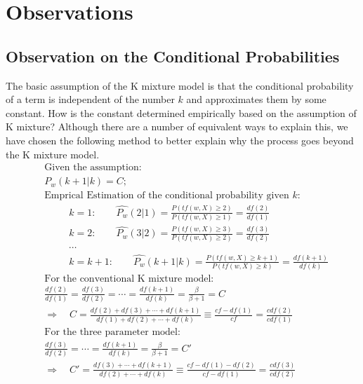 \documentclass[english]{jnlp_1.4_rep}
\begin{document}
\section{Observations}

\subsection{Observation on the Conditional Probabilities}

The basic assumption of the K mixture model is that the conditional probability of a term is independent of the number $k$ and approximates them by
some constant. How is the constant determined empirically based on the assumption of K mixture? Although there are a number of equivalent ways to
explain this, we have chosen the following method to better explain why the process goes beyond the K mixture model.
\begin{align*}
 & \mbox{Given the assumption: } \\
 & P_{w}(k + 1\vert k) = C; \\
 & \mbox{Emprical Estimation of the conditional probability given $k$: }\\
 & \hspace{30pt} k = 1:\qquad \hat{P_{w}}(2 \vert 1)   = \frac{P(\mathit{tf}(w,X)\ge 2)}{P(\mathit{tf}(w,X)\ge 1)}= \frac{\mathit{df}(2) }{\mathit{df}(1) } \\
 & \hspace{30pt}k = 2:\qquad \hat{P_{w}}(3 \vert 2)   = \frac{P(\mathit{tf}(w,X)\ge 3)}{P(\mathit{tf}(w,X)\ge 2)}= \frac{\mathit{df}(3) }{\mathit{df}(2) } \\
 & \hspace{30pt}\cdots \\
 & \hspace{30pt}k= k+1:\qquad\hat{P_{w}}(k+1 \vert k) = \frac{P(\mathit{tf}(w,X)\ge k+1)}{P(\mathit{tf}(w,X)\ge k)} = \frac{\mathit{df}(k+1)}{\mathit{df}(k)}\\
 & \mbox{For the conventional K mixture model: }\\
 & \frac{\mathit{df}(2) }{\mathit{df}(1) } = \frac{\mathit{df}(3) }{\mathit{df}(2) }
	    = \cdots
	    = \frac{\mathit{df}(k+1) }{\mathit{df}(k) } = \frac{\beta }{\beta+ 1} = C  \\
 & \Rightarrow \quad 
    C = \frac{\mathit{df}(2) + \mathit{df}(3) + \cdots + \mathit{df}(k+1) }{\mathit{df}(1) + \mathit{df}(2) +\cdots + \mathit{df}(k) } 
	\equiv \frac{\mathit{cf} - \mathit{df}(1) }{\mathit{cf}} = \frac{\mathit{cdf}(2)}{\mathit{cdf}(1)}  \\
 & \mbox{For the three parameter model: } \\
 & \frac{\mathit{df}(3) }{\mathit{df}(2) }
    = \cdots
    = \frac{\mathit{df}(k+1) }{\mathit{df}(k) } = \frac{\beta }{\beta+ 1} = C' \\
 & \Rightarrow \quad
    C'= \frac{\mathit{df}(3) + \cdots + \mathit{df}(k+1) }{\mathit{df}(2) +\cdots + \mathit{df}(k)} 
	\equiv \frac{\mathit{cf} - \mathit{df}(1)-\mathit{df}(2) }{\mathit{cf}-\mathit{df}(1)}= \frac{\mathit{cdf}(3)}{\mathit{cdf}(2)}
\end{align*}
\end{document}
